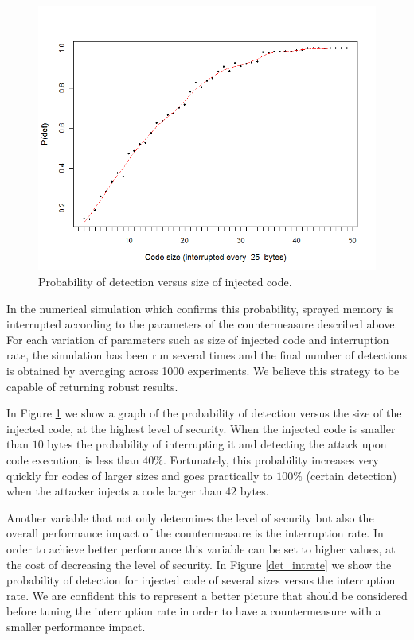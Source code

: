 \begin{figure}[htbp] 
\begin{center}
\includegraphics[scale=0.5]{images/bubble_det_codesize}
\caption{{Probability of detection versus size of injected code.}}
\label{det_codesize}
\end{center}
\end{figure}


In the numerical simulation which confirms this probability, sprayed memory is interrupted according to the parameters of the countermeasure described above. For each variation of parameters such as size of injected code and interruption rate, the simulation has been run several times and the final number of detections is obtained by averaging across 1000 experiments. We believe this strategy to be capable of returning robust results.

In Figure \ref{det_codesize} we show a graph of the probability of detection versus the size of the injected code, at the highest level of security. When the injected code is smaller than $10$ bytes the probability of interrupting it and detecting the attack upon code execution, is less than $40\%$.
Fortunately, this probability increases very quickly for codes of larger sizes and goes practically to $100\%$ (certain detection) when the attacker injects a code larger than $42$ bytes.  

Another variable that not only determines the level of security but also the overall performance impact of the countermeasure is the interruption rate. In order to achieve better performance this variable can be set to higher values, at the cost of decreasing the level of security. In Figure \ref{det_intrate} we show the probability of detection for injected code of several sizes versus the interruption rate. We are confident this to represent a better picture that should be considered before tuning the interruption rate in order to have a countermeasure with a smaller performance impact.


